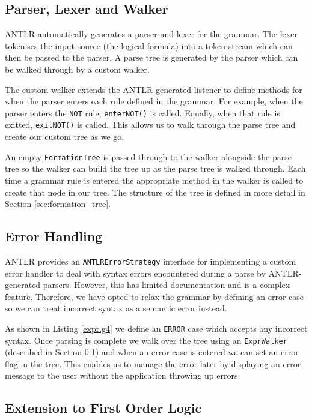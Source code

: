 \documentclass{report}
\begin{document}
\subsection{Parser, Lexer and Walker}
\label{sub:walker}

ANTLR automatically generates a parser and lexer for the grammar. The lexer tokenises the input source (the logical formula) into a token stream which can then be passed to the parser. A parse tree is generated by the parser which can be walked through by a custom walker. 

The custom walker extends the ANTLR generated listener to define methods for when the parser enters each rule defined in the grammar. For example, when the parser enters the {\tt NOT} rule, {\tt enterNOT()} is called. Equally, when that rule is exitted, {\tt exitNOT()} is called. This allows us to walk through the parse tree and create our custom tree as we go.

An empty {\tt FormationTree} is passed through to the walker alongside the parse tree so the walker can build the tree up as the parse tree is walked through. Each time a grammar rule is entered the appropriate method in the walker is called to create that node in our tree. The structure of the tree is defined in more detail in Section \ref{sec:formation_tree}.

\subsection{Error Handling}

ANTLR provides an {\tt ANTLRErrorStrategy} interface for implementing a custom error handler to deal with syntax errors encountered during a parse by ANTLR-generated parsers. However, this has limited documentation and is a complex feature. Therefore, we have opted to relax the grammar by defining an error case so we can treat incorrect syntax as a semantic error instead.

As shown in Listing \ref{expr.g4} we define an {\tt ERROR} case which accepts any incorrect syntax. Once parsing is complete we walk over the tree using an {\tt ExprWalker} (described in Section \ref{sub:walker}) and when an error case is entered we can set an error flag in the tree. This enables us to manage the error later by displaying an error message to the user without the application throwing up errors.

\subsection{Extension to First Order Logic}
\end{document}
